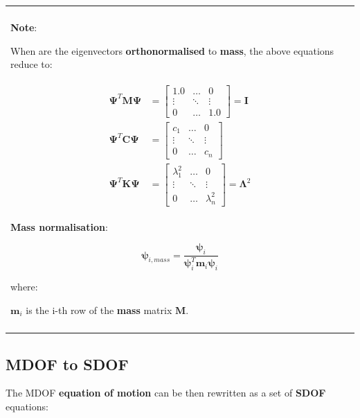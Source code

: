 \documentclass[10pt,b5paper,titlepage]{book}
\newenvironment{bbox}[1][1.0]
{
    \begin{center}
        \begin{tabular}{|p{#1\textwidth}|}
            \hline\\
}
{
            \\\\\hline
        \end{tabular}
    \end{center}
}
\newenvironment{ematrix}
{
    \begin{eqnarray}
        \begin{aligned}
}
{
        \end{aligned}
    \end{eqnarray}
}
\begin{document}
\begin{bbox}[0.96]
    \textbf{Note}:

    When are the eigenvectors \textbf{orthonormalised} to \textbf{mass}, the above
    equations reduce to:

    \begin{ematrix}
        \mathbf{\Psi}^T \mathbf{M} \mathbf{\Psi}
        &= \begin{bmatrix}
            1.0 & \dots & 0 \\
            \vdots & \ddots & \vdots \\
            0 & \dots & 1.0
        \end{bmatrix} = \mathbf{I} \\
        \mathbf{\Psi}^T \mathbf{C} \mathbf{\Psi}
        &= \begin{bmatrix}
            c_1 & \dots & 0 \\
            \vdots & \ddots & \vdots \\
            0 & \dots & c_n
        \end{bmatrix} \\
        \mathbf{\Psi}^T \mathbf{K} \mathbf{\Psi}
        &= \begin{bmatrix}
            \lambda_1^2 & \dots & 0 \\
            \vdots & \ddots & \vdots \\
            0 & \dots & \lambda_n^2
        \end{bmatrix} = \mathbf{\Lambda}^2
    \end{ematrix}

    \textbf{Mass normalisation}:

    \begin{equation}
        \mathbf{\psi}_{i,mass} = \frac{\mathbf{\psi}_i}{\mathbf{\psi}_i^T \mathbf{m}_i \mathbf{\psi}_i}
    \end{equation}

    where:

    $ \mathbf{m}_i $ is the i-th row of the \textbf{mass} matrix $ \mathbf{M} $.

\end{bbox}


\subsection{MDOF to SDOF}

The MDOF \textbf{equation of motion} can be then rewritten as a set of \textbf{SDOF}
equations:
\end{document}
